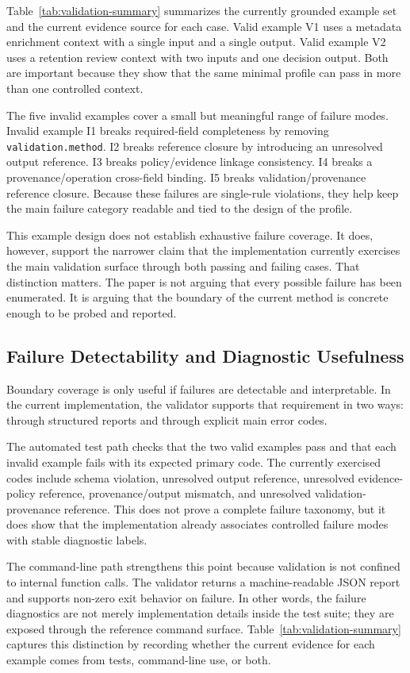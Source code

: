 Table~\ref{tab:validation-summary} summarizes the currently grounded example set and the current evidence source for each case. Valid example V1 uses a metadata enrichment context with a single input and a single output. Valid example V2 uses a retention review context with two inputs and one decision output. Both are important because they show that the same minimal profile can pass in more than one controlled context.

The five invalid examples cover a small but meaningful range of failure modes. Invalid example I1 breaks required-field completeness by removing \texttt{validation.method}. I2 breaks reference closure by introducing an unresolved output reference. I3 breaks policy/evidence linkage consistency. I4 breaks a provenance/operation cross-field binding. I5 breaks validation/provenance reference closure. Because these failures are single-rule violations, they help keep the main failure category readable and tied to the design of the profile.

This example design does not establish exhaustive failure coverage. It does, however, support the narrower claim that the implementation currently exercises the main validation surface through both passing and failing cases. That distinction matters. The paper is not arguing that every possible failure has been enumerated. It is arguing that the boundary of the current method is concrete enough to be probed and reported.

\subsection{Failure Detectability and Diagnostic Usefulness}

Boundary coverage is only useful if failures are detectable and interpretable. In the current implementation, the validator supports that requirement in two ways: through structured reports and through explicit main error codes.

The automated test path checks that the two valid examples pass and that each invalid example fails with its expected primary code. The currently exercised codes include schema violation, unresolved output reference, unresolved evidence-policy reference, provenance/output mismatch, and unresolved validation-provenance reference. This does not prove a complete failure taxonomy, but it does show that the implementation already associates controlled failure modes with stable diagnostic labels.

The command-line path strengthens this point because validation is not confined to internal function calls. The validator returns a machine-readable JSON report and supports non-zero exit behavior on failure. In other words, the failure diagnostics are not merely implementation details inside the test suite; they are exposed through the reference command surface. Table~\ref{tab:validation-summary} captures this distinction by recording whether the current evidence for each example comes from tests, command-line use, or both.

